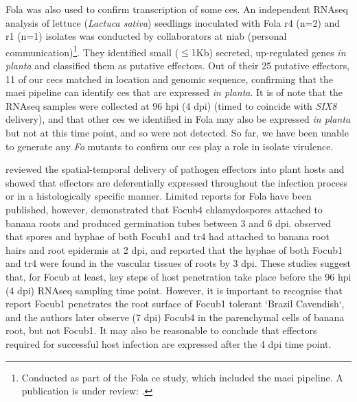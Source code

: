 \ac{Fola} was also used to confirm transcription of some \acp{ce}. An independent RNAseq analysis of lettuce (\textit{Lactuca sativa}) seedlings inoculated with \ac{Fola} \ac{r4} (n=2) and \ac{r1} (n=1) isolates was conducted by collaborators at \ac{niab} (personal communication)\footnote{Conducted as part of the \acl{Fola} \ac{ce} study, which included the \ac{maei} pipeline. A publication is under review: \textcite{FolaManuscript}.}. They identified small ($\le1$Kb) secreted, up-regulated genes \textit{in planta} and classified them as putative effectors. Out of their 25 putative effectors, 11 of our \acp{cec} matched in location and genomic sequence, confirming that the \ac{maei} pipeline can identify \acp{ce} that are expressed \textit{in planta}. It is of note that the RNAseq samples were collected at 96 \ac{hpi} (4 \ac{dpi}) (timed to coincide with \textit{SIX8} delivery), and that other \acp{ce} we identified in \ac{Fola} may also be expressed \textit{in planta} but not at this time point, and so were not detected. So far, we have been unable to generate any \textit{Fo} mutants to confirm our \acp{ce} play a role in isolate virulence. 

\textcite{Toruno2016} reviewed the spatial-temporal delivery of pathogen effectors into plant hosts and showed that effectors are deferentially expressed throughout the infection process or in a histologically specific manner. Limited reports for \ac{Fola} have been published, however, \textcite{Li2011} demonstrated that \ac{Focub4} chlamydospores attached to banana roots and produced germination tubes between 3 and 6 \ac{dpi}. \textcite{Li2017} observed that spores and hyphae of both \ac{Focub1} and \ac{tr4} had attached to banana root hairs and root epidermis at 2 \ac{dpi}, and reported that the hyphae of both \ac{Focub1} and \ac{tr4} were found in the vascular tissues of roots by 3 \ac{dpi}. These studies suggest that, for \ac{Focub} at least, key steps of host penetration take place before the 96 \ac{hpi} (4 \ac{dpi}) RNAseq sampling time point. However, it is important to recognise that \textcite{Li2017} report \ac{Focub1} penetrates the root surface of \ac{Focub1} tolerant `Brazil Cavendish`, and the authors later observe (7 \ac{dpi})  \ac{Focub4} in the parenchymal cells of banana root, but not \ac{Focub1}. It may also be reasonable to conclude that effectors required for successful host infection are expressed after the 4 \ac{dpi} time point.  


